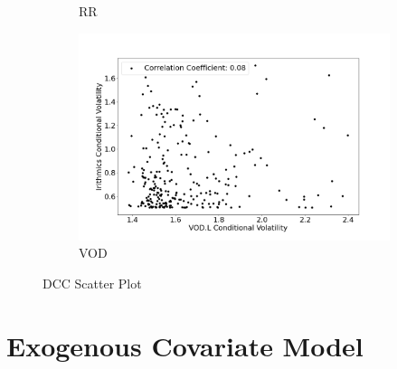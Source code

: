\begin{figure}[hbt!]
\begin{subfigure}{.49\linewidth}
  \caption{RR}
  \label{fig:C}
\end{subfigure} %
\begin{subfigure}{.49\linewidth}
  \includegraphics[width=\linewidth]{images/dcc_scatter/plot 4.png}
  \caption{VOD}
  \label{fig:D}
\end{subfigure}
\caption{DCC Scatter Plot}
\end{figure}

\section{Exogenous Covariate Model}
